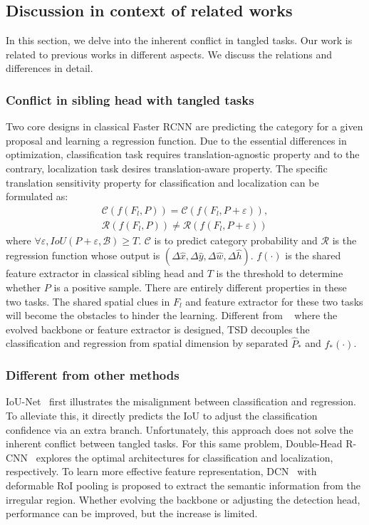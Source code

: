 \documentclass[10pt,twocolumn,letterpaper]{article}
\def \algname{TSD}
\begin{document}
\subsection{Discussion in context of related works}
In this section, we delve into the inherent conflict in tangled tasks.
Our work is related to previous works in different aspects. We discuss the relations and differences in detail.
\subsubsection{Conflict in sibling head with tangled tasks}\label{discuss}

Two core designs in classical Faster RCNN are predicting the category for a given proposal and learning a regression function.
Due to the essential differences in optimization, classification task requires translation-agnostic property and to the contrary, localization task desires translation-aware property.
The specific translation sensitivity property for classification and localization can be formulated as:
\begin{equation}
\begin{split}
\mathcal{C}(f(F_l, P)) = \mathcal{C}(f(F_l, P + \varepsilon)), \\ \mathcal{R}(f(F_l, P)) \neq \mathcal{R}(f(F_l, P + \varepsilon))  \end{split}
\end{equation}
where $\forall \varepsilon, IoU(P + \varepsilon, \mathcal{B}) \geq T$. $\mathcal{C}$ is to predict category probability and $\mathcal{R}$ is the regression function whose output is $(\Delta\hat{x}, \Delta\hat{y}, \Delta\hat{w}, \Delta\hat{h})$.
$f(\cdot)$ is the shared feature extractor in classical sibling head and $T$ is the threshold to determine whether $P$ is a positive sample.
There are entirely different properties in these two tasks.
The shared spatial clues in $F_l$ and feature extractor for these two tasks will become the obstacles to hinder the learning.
Different from ~\cite{wu2019rethinking,jiang2018acquisition,dai2017deformable,zhu2019deformable} where the evolved backbone or feature extractor is designed, \algname{} decouples the classification and regression from spatial dimension by separated $\hat{P}_*$ and $f_*(\cdot)$.

\subsubsection{Different from other methods}
IoU-Net~\cite{jiang2018acquisition} first illustrates the misalignment between classification and regression. To alleviate this, it directly predicts the IoU to adjust the classification confidence via an extra branch.
Unfortunately, this approach does not solve the inherent conflict between tangled tasks.
For this same problem, Double-Head R-CNN~\cite{wu2019rethinking} explores the optimal architectures for classification and localization, respectively.
To learn more effective feature representation, DCN~\cite{dai2017deformable} with deformable RoI pooling is proposed to extract the semantic information from the irregular region.
Whether evolving the backbone or adjusting the detection head,
performance can be improved, but the increase is limited.
\end{document}
